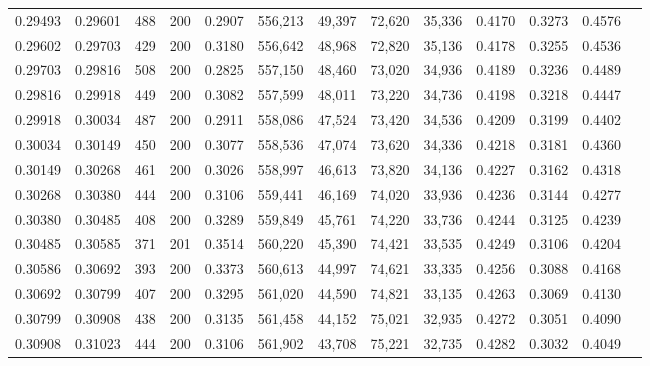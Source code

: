 \begin{tabular}{rrrrrrrrrrrrr}
0.29493 & 0.29601 &    488 & 200 &                                     0.2907 & 556,213 &  49,397 &  72,620 &  35,336 & 0.4170 & 0.3273 & 0.4576 \\
0.29602 & 0.29703 &    429 & 200 &                                     0.3180 & 556,642 &  48,968 &  72,820 &  35,136 & 0.4178 & 0.3255 & 0.4536 \\
0.29703 & 0.29816 &    508 & 200 &                                     0.2825 & 557,150 &  48,460 &  73,020 &  34,936 & 0.4189 & 0.3236 & 0.4489 \\
0.29816 & 0.29918 &    449 & 200 &                                     0.3082 & 557,599 &  48,011 &  73,220 &  34,736 & 0.4198 & 0.3218 & 0.4447 \\
0.29918 & 0.30034 &    487 & 200 &                                     0.2911 & 558,086 &  47,524 &  73,420 &  34,536 & 0.4209 & 0.3199 & 0.4402 \\
0.30034 & 0.30149 &    450 & 200 &                                     0.3077 & 558,536 &  47,074 &  73,620 &  34,336 & 0.4218 & 0.3181 & 0.4360 \\
0.30149 & 0.30268 &    461 & 200 &                                     0.3026 & 558,997 &  46,613 &  73,820 &  34,136 & 0.4227 & 0.3162 & 0.4318 \\
0.30268 & 0.30380 &    444 & 200 &                                     0.3106 & 559,441 &  46,169 &  74,020 &  33,936 & 0.4236 & 0.3144 & 0.4277 \\
0.30380 & 0.30485 &    408 & 200 &                                     0.3289 & 559,849 &  45,761 &  74,220 &  33,736 & 0.4244 & 0.3125 & 0.4239 \\
0.30485 & 0.30585 &    371 & 201 &                                     0.3514 & 560,220 &  45,390 &  74,421 &  33,535 & 0.4249 & 0.3106 & 0.4204 \\
0.30586 & 0.30692 &    393 & 200 &                                     0.3373 & 560,613 &  44,997 &  74,621 &  33,335 & 0.4256 & 0.3088 & 0.4168 \\
0.30692 & 0.30799 &    407 & 200 &                                     0.3295 & 561,020 &  44,590 &  74,821 &  33,135 & 0.4263 & 0.3069 & 0.4130 \\
0.30799 & 0.30908 &    438 & 200 &                                     0.3135 & 561,458 &  44,152 &  75,021 &  32,935 & 0.4272 & 0.3051 & 0.4090 \\
0.30908 & 0.31023 &    444 & 200 &                                     0.3106 & 561,902 &  43,708 &  75,221 &  32,735 & 0.4282 & 0.3032 & 0.4049 \\

\end{tabular}
